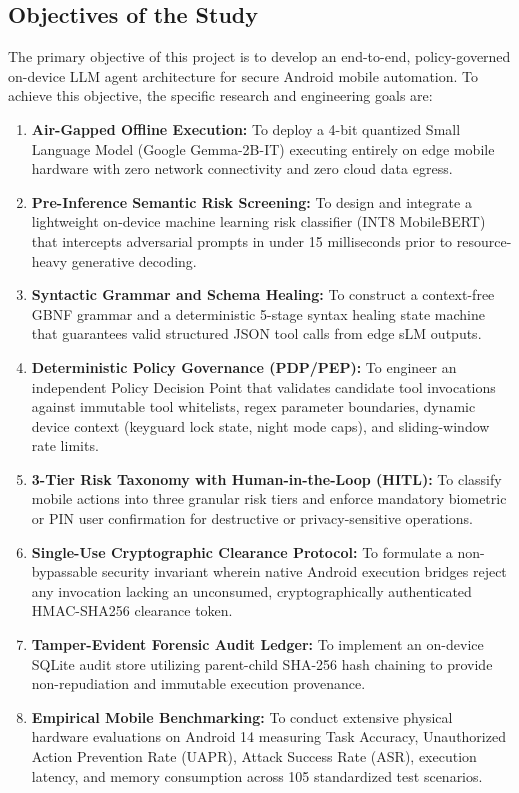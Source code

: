 \subsection{Objectives of the Study}
The primary objective of this project is to develop an end-to-end, policy-governed on-device LLM agent architecture for secure Android mobile automation. To achieve this objective, the specific research and engineering goals are:
\begin{enumerate}
    \item \textbf{Air-Gapped Offline Execution:} To deploy a 4-bit quantized Small Language Model (Google Gemma-2B-IT) executing entirely on edge mobile hardware with zero network connectivity and zero cloud data egress.
    \item \textbf{Pre-Inference Semantic Risk Screening:} To design and integrate a lightweight on-device machine learning risk classifier (INT8 MobileBERT) that intercepts adversarial prompts in under 15 milliseconds prior to resource-heavy generative decoding.
    \item \textbf{Syntactic Grammar and Schema Healing:} To construct a context-free GBNF grammar and a deterministic 5-stage syntax healing state machine that guarantees valid structured JSON tool calls from edge sLM outputs.
    \item \textbf{Deterministic Policy Governance (PDP/PEP):} To engineer an independent Policy Decision Point that validates candidate tool invocations against immutable tool whitelists, regex parameter boundaries, dynamic device context (keyguard lock state, night mode caps), and sliding-window rate limits.
    \item \textbf{3-Tier Risk Taxonomy with Human-in-the-Loop (HITL):} To classify mobile actions into three granular risk tiers and enforce mandatory biometric or PIN user confirmation for destructive or privacy-sensitive operations.
    \item \textbf{Single-Use Cryptographic Clearance Protocol:} To formulate a non-bypassable security invariant wherein native Android execution bridges reject any invocation lacking an unconsumed, cryptographically authenticated HMAC-SHA256 clearance token.
    \item \textbf{Tamper-Evident Forensic Audit Ledger:} To implement an on-device SQLite audit store utilizing parent-child SHA-256 hash chaining to provide non-repudiation and immutable execution provenance.
    \item \textbf{Empirical Mobile Benchmarking:} To conduct extensive physical hardware evaluations on Android 14 measuring Task Accuracy, Unauthorized Action Prevention Rate (UAPR), Attack Success Rate (ASR), execution latency, and memory consumption across 105 standardized test scenarios.
\end{enumerate}

